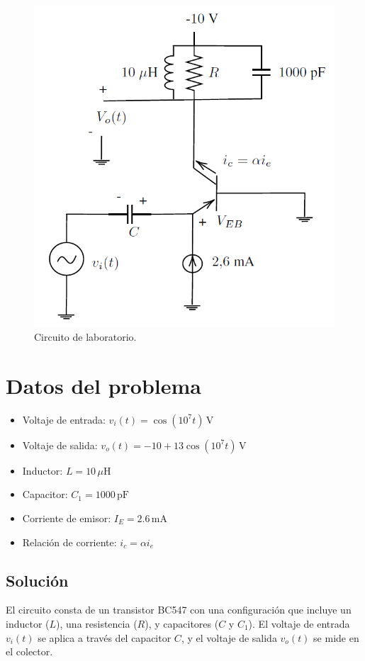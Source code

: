 \begin{figure}[h]
    \centering
    \includegraphics[width=0.75\linewidth]{circuito .png}
    \caption{Circuito de laboratorio.}
    \label{fi1}
\end{figure}
\section*{Datos del problema}
\begin{itemize}
    \item Voltaje de entrada: \( v_i(t) = \cos(10^7 t) \, \text{V} \)
    \item Voltaje de salida: \( v_o(t) = -10 + 13 \cos(10^7 t) \, \text{V} \)
    \item Inductor: \( L = 10 \, \mu\text{H} \)
    \item Capacitor: \( C_1 = 1000 \, \text{pF} \)
    \item Corriente de emisor: \( I_E = 2.6 \, \text{mA} \)
    \item Relación de corriente: \( i_c = \alpha i_e \)
\end{itemize}


\subsection{Solución}

El circuito consta de un transistor BC547 con una configuración que incluye un inductor (\( L \)), una resistencia (\( R \)), y capacitores (\( C \) y \( C_1 \)). El voltaje de entrada \( v_i(t) \) se aplica a través del capacitor \( C \), y el voltaje de salida \( v_o(t) \) se mide en el colector.

